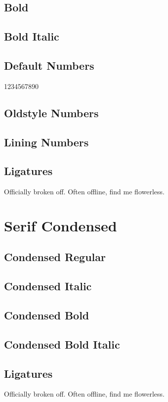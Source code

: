 \documentclass{article}
\begin{document}
\subsection*{Bold}

\textbf{\lipsum[3]}



\subsection*{Bold Italic}

\textbf{\textit{\lipsum[4]}}

\subsection*{Default Numbers}

1234567890

\subsection*{Oldstyle Numbers}


\subsection*{Lining Numbers}


\subsection*{Ligatures}


Officially broken off. Often offline, find me flowerless.


\section*{Serif Condensed}

\subsection*{Condensed Regular}

{\robotoserifcondensed\lipsum[1]}

\subsection*{Condensed Italic}

{\robotoserifcondensed\textit{\lipsum[2]}}

\subsection*{Condensed Bold}

{\robotoserifboldcondensed\lipsum[3]}



\subsection*{Condensed Bold Italic}

{\robotoserifboldcondensed\textit{\lipsum[4]}}


\subsection*{Ligatures}

{\robotoserifcondensed Officially broken off. Often offline, find me flowerless.}
\end{document}
